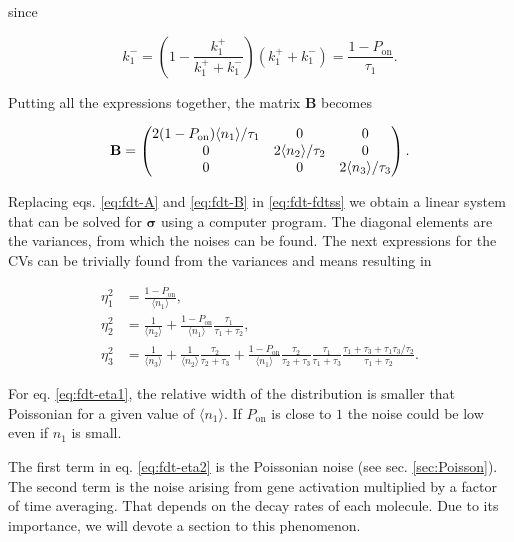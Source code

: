since

\begin{equation*}
  k_1^- = \left(1-\frac{k_1^+}{k_1^++k_1^-}\right)(k_1^++k_1^-)=\frac{1-P_\text{on}}{\tau_1}.
\end{equation*}

Putting all the expressions together, the matrix $\mathbf{B}$ becomes

\begin{equation}
  \label{eq:fdt-B}
  \mathbf{B} = 
  \begin{pmatrix}
    2(1-P_\text{on})\langle n_1\rangle/\tau_1 & 0 & 0 \\
    0 & 2\langle n_2\rangle/\tau_2 & 0 \\
    0 & 0 & 2\langle n_3\rangle/\tau_3
  \end{pmatrix}.\\
\end{equation}

Replacing eqs. \eqref{eq:fdt-A} and \eqref{eq:fdt-B} in \eqref{eq:fdt-fdtss} we obtain a linear system that can be solved for $\mathbf{\sigma}$ using a computer program. The diagonal elements are the variances, from which the noises can be found. The next expressions for the CVs can be trivially found from the variances and means resulting in

\begin{align}
  \eta_1^2 &= \frac{1-P_\text{on}}{\langle n_1\rangle}, \label{eq:fdt-eta1}\\
  \eta_2^2 &= \frac{1}{\langle n_2\rangle}+\frac{1-P_\text{on}}{\langle n_1\rangle}\frac{\tau_1}{\tau_1+\tau_2}, \label{eq:fdt-eta2}\\
  \eta_3^2 &= \frac{1}{\langle n_3\rangle} + \frac{1}{\langle n_2\rangle}\frac{\tau_2}{\tau_2+\tau_3}+\frac{1-P_\text{on}}{\langle n_1\rangle}\frac{\tau_2}{\tau_2+\tau_3}\frac{\tau_1}{\tau_1+\tau_3}\frac{\tau_1+\tau_3+\tau_1\tau_3/\tau_2}{\tau_1+\tau_2}. \label{eq:fdt-eta3}
\end{align}

For eq. \eqref{eq:fdt-eta1}, the relative width of the distribution is smaller that Poissonian for a given value of $\langle n_1\rangle$. If $P_\text{on}$ is close to $1$ the noise could be low even if $n_1$ is small.

The first term in eq. \eqref{eq:fdt-eta2} is the Poissonian noise (see sec. \ref{sec:Poisson}). The second term is the noise arising from gene activation multiplied by a factor of time averaging. That depends on the decay rates of each molecule. Due to its importance, we will devote a section to this phenomenon.

